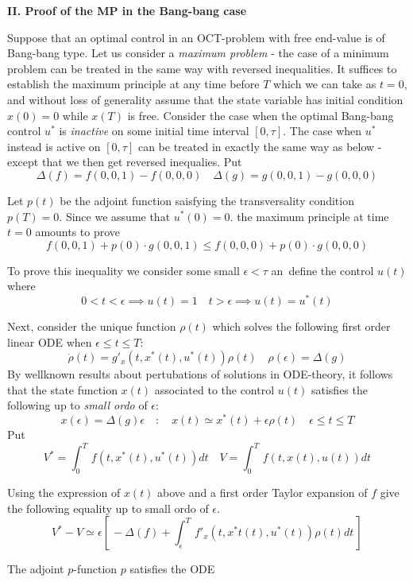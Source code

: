 \documentclass{amsart}
\begin{document}
\bigskip

\centerline{\bf\large II. Proof of the MP
in the Bang-bang case}
\bigskip

\noindent 
Suppose that an optimal control in an OCT-problem with free end-value is of Bang-bang type. Let us consider  a \emph{maximum problem} - the case of a
minimum problem can be treated in the same way with reversed inequalities. 
It suffices to establish the maximum principle 
at any time before $T$ which we can take as 
$t=0$, and without loss of generality assume that the state variable has
initial condition $x(0)=0$ while $x(T)$ is free.
Consider the case when the optimal  Bang-bang control $u^*$ is \emph{inactive}
on some initial time interval $[0,\tau]$. The case when $u^*$ instead 
is active on  $[0,\tau]$
can be treated in exactly the same way as below - except that we then get reversed inequalies.
Put
\medskip
\[
\Delta(f)=f(0,0,1)-f(0,0,0)\quad
\Delta(g)=g(0,0,1)-g(0,0,0)
\]

\noindent
Let $p(t)$ be the adjoint function saisfying the transversality condition $p(T)=0$.
Since we assume that $u^*(0)=0$.
the maximum principle at time $t=0$ amounts  to prove 
\[
f(0,0,1)+p(0)\cdot g(0,0,1)\leq f(0,0,0)+p(0)\cdot g(0,0,0)
\]


\noindent
To prove this inequality we consider some small $\epsilon<\tau$
an\ define the control $u(t)$ where 
\[
0<t<\epsilon\implies u(t)=1\quad t>\epsilon\implies u(t)=u^*(t)
\]
\medskip

\noindent 
Next, consider the unique function $\rho(t)$
which solves the following first order linear ODE when $\epsilon\leq t\leq T$:
\[ 
\dot\rho(t)= g'_x(t,x^*(t),u^*(t))\rho(t)\quad \rho(\epsilon)=\Delta(g)
\]
By wellknown  results about
pertubations of solutions in ODE-theory, it follows that
the state function $x(t)$ associated to the control
$u(t)$ satisfies the following up to \emph{small ordo} of $\epsilon$:
\[
x(\epsilon)=\Delta(g)\epsilon\quad\colon\quad x(t)\simeq x^*(t)+\epsilon\rho(t)
\quad \epsilon\leq t\leq T
\]
Put
\[
 V^*=\int_0^T\, f(t,x^*(t),u^*(t))dt\quad
 V=\int_0^T\, f(t,x(t),u(t)) dt
 \]

\medskip

\noindent
Using the  expression of $x(t)$ above and a first order Taylor expansion of $f$ 
give the following equality up to small ordo of 
$\epsilon$.
\[
V^*-V\simeq \epsilon[\,-\Delta(f)+\int_\epsilon^T\,f'_x(t,x^*t(t),u^*(t))\rho(t)dt\,]
\]
\medskip

\noindent The adjoint $p$-function $p$ 
satisfies the ODE
\end{document}
